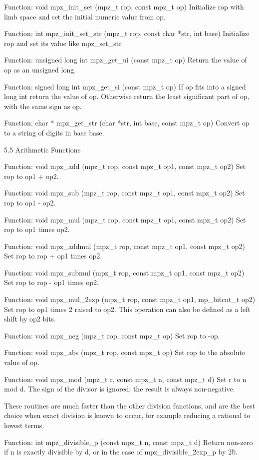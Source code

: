  Function: void mpz\_init\_set (mpz\_t rop, const mpz\_t op)
Initialize rop with limb space and set the initial numeric value from op.

 Function: int mpz\_init\_set\_str (mpz\_t rop, const char *str, int base)
Initialize rop and set its value like mpz\_set\_str

 Function: unsigned long int mpz\_get\_ui (const mpz\_t op)
Return the value of op as an unsigned long.

 Function: signed long int mpz\_get\_si (const mpz\_t op)
If op fits into a signed long int return the value of op. Otherwise return the
least significant part of op, with the same sign as op.

 Function: char * mpz\_get\_str (char *str, int base, const mpz\_t op)
Convert op to a string of digits in base base.

5.5 Arithmetic Functions

 Function: void mpz\_add (mpz\_t rop, const mpz\_t op1, const mpz\_t op2)
Set rop to op1 + op2.

 Function: void mpz\_sub (mpz\_t rop, const mpz\_t op1, const mpz\_t op2)
Set rop to op1 - op2.

 Function: void mpz\_mul (mpz\_t rop, const mpz\_t op1, const mpz\_t op2)
Set rop to op1 times op2.

 Function: void mpz\_addmul (mpz\_t rop, const mpz\_t op1, const mpz\_t op2)
Set rop to rop + op1 times op2.

 Function: void mpz\_submul (mpz\_t rop, const mpz\_t op1, const mpz\_t op2)
Set rop to rop - op1 times op2.

 Function: void mpz\_mul\_2exp (mpz\_t rop, const mpz\_t op1, mp\_bitcnt\_t op2)
Set rop to op1 times 2 raised to op2. This operation can also be defined as a
left shift by op2 bits.

 Function: void mpz\_neg (mpz\_t rop, const mpz\_t op)
Set rop to -op.

 Function: void mpz\_abs (mpz\_t rop, const mpz\_t op)
Set rop to the absolute value of op.

 Function: void mpz\_mod (mpz\_t r, const mpz\_t n, const mpz\_t d)
Set r to n mod d. The sign of the divisor is ignored; the result is always
non-negative.

These routines are much faster than the other division functions, and are the
best choice when exact division is known to occur, for example reducing a
rational to lowest terms.

 Function: int mpz\_divisible\_p (const mpz\_t n, const mpz\_t d)
Return non-zero if n is exactly divisible by d, or in the case of
mpz\_divisible\_2exp\_p by 2\^b.


